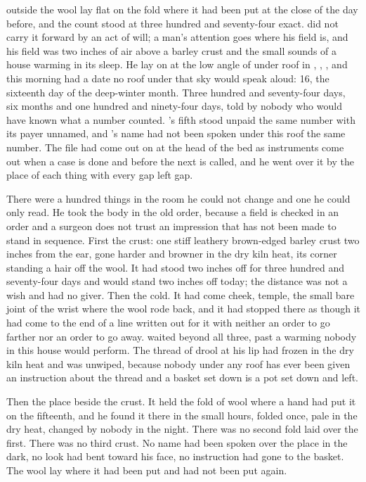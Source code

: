 
 outside the wool lay flat on the fold where it had been put at the close of the day before, and the count stood at three hundred and seventy-four exact.  did not carry it forward by an act of will; a man's attention goes where his field is, and his field was two inches of air above a barley crust and the small sounds of a house warming in its sleep. He lay on  at the low angle of  under  roof in , , , and this morning had a date no roof under that sky would speak aloud:  16, the sixteenth day of the deep-winter month. Three hundred and seventy-four days, six months and one hundred and ninety-four days, told by nobody who would have known what a number counted. 's fifth stood unpaid the same number with its payer unnamed, and 's name had not been spoken under this roof the same number. The file had come out on  at the head of the bed as instruments come out when a case is done and before the next is called, and he went over it by the place of each thing with every gap left gap.

There were a hundred things in the room he could not change and one he could only read. He took the body in the old order, because a field is checked in an order and a surgeon does not trust an impression that has not been made to stand in sequence. First the crust: one stiff leathery brown-edged barley crust two inches from the ear, gone harder and browner in the dry kiln heat, its corner standing a hair off the wool. It had stood two inches off for three hundred and seventy-four days and would stand two inches off today; the distance was not a wish and had no giver. Then the cold. It had come cheek, temple, the small bare joint of the wrist where the wool rode back, and it had stopped there as though it had come to the end of a line written out for it with neither an order to go farther nor an order to go away.  waited beyond all three, past a warming nobody in this house would perform. The thread of drool at his lip had frozen in the dry kiln heat and was unwiped, because nobody under any roof has ever been given an instruction about the thread and a basket set down is a pot set down and left.

Then the place beside the crust. It held the fold of wool where a hand had put it on the fifteenth, and he found it there in the small hours, folded once, pale in the dry heat, changed by nobody in the night. There was no second fold laid over the first. There was no third crust. No name had been spoken over the place in the dark, no look had bent toward his face, no instruction had gone to the basket. The wool lay where it had been put and had not been put again.


